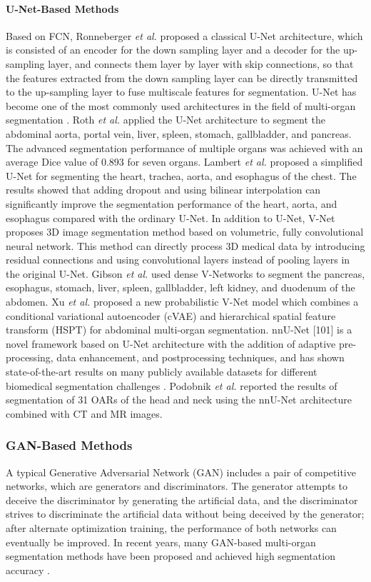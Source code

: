 \documentclass[lettersize,journal]{IEEEtran}
\begin{document}
\paragraph{U-Net-Based Methods}
Based on FCN, Ronneberger {\it{et al.}} \cite{99} proposed a classical U-Net architecture, which is consisted of an encoder for the down sampling layer and a decoder for the up-sampling layer, and connects them layer by layer with skip connections, so that the features extracted from the down sampling layer can be directly transmitted to the up-sampling layer to fuse multiscale features for segmentation. U-Net has become one of the most commonly used architectures in the field of multi-organ segmentation \cite{39,40,42,48,61,69,78}. Roth {\it{et al.}} \cite{61} applied the U-Net architecture to segment the abdominal aorta, portal vein, liver, spleen, stomach, gallbladder, and pancreas. The advanced segmentation performance of multiple organs was achieved with an average Dice value of 0.893 for seven organs. Lambert {\it{et al.}} \cite{86} proposed a simplified U-Net for segmenting the heart, trachea, aorta, and esophagus of the chest. The results showed that adding dropout and using bilinear interpolation can significantly improve the segmentation performance of the heart, aorta, and esophagus compared with the ordinary U-Net. In addition to U-Net, V-Net \cite{100} proposes 3D image segmentation method based on volumetric, fully convolutional neural network. This method can directly process 3D medical data by introducing residual connections and using convolutional layers instead of pooling layers in the original U-Net. Gibson {\it{et al.}} \cite{60} used dense V-Networks to segment the pancreas, esophagus, stomach, liver, spleen, gallbladder, left kidney, and duodenum of the abdomen. Xu {\it{et al.}} \cite{77} proposed a new probabilistic V-Net model which combines a conditional variational autoencoder (cVAE) and hierarchical spatial feature transform (HSPT) for abdominal multi-organ segmentation. nnU-Net [101] is a novel framework based on U-Net architecture with the addition of adaptive pre-processing, data enhancement, and postprocessing techniques, and has shown state-of-the-art results on many publicly available datasets for different biomedical segmentation challenges \cite{50,102,103,104}. Podobnik {\it{et al.}} \cite{50} reported the results of segmentation of 31 OARs of the head and neck using the nnU-Net architecture combined with CT and MR images.

\subsubsection{GAN-Based Methods}
A typical Generative Adversarial Network (GAN) \cite{105} includes a pair of competitive networks, which are generators and discriminators. The generator attempts to deceive the discriminator by generating the artificial data, and the discriminator strives to discriminate the artificial data without being deceived by the generator; after alternate optimization training, the performance of both networks can eventually be improved. In recent years, many GAN-based multi-organ segmentation methods have been proposed and achieved high segmentation accuracy \cite{41,62,84,106,107,108,109}.
\end{document}
